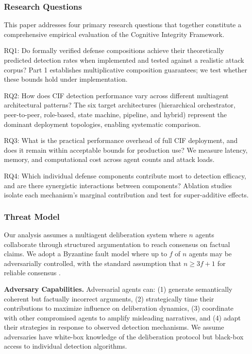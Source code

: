 \documentclass[
]{article}
\begin{document}
\subsubsection{Research Questions}\label{research-questions}

This paper addresses four primary research questions that together
constitute a comprehensive empirical evaluation of the Cognitive
Integrity Framework.

RQ1: Do formally verified defense compositions achieve their
theoretically predicted detection rates when implemented and tested
against a realistic attack corpus? Part 1 establishes multiplicative
composition guarantees; we test whether these bounds hold under
implementation.

RQ2: How does CIF detection performance vary across different multiagent
architectural patterns? The six target architectures (hierarchical
orchestrator, peer-to-peer, role-based, state machine, pipeline, and
hybrid) represent the dominant deployment topologies, enabling
systematic comparison.

RQ3: What is the practical performance overhead of full CIF deployment,
and does it remain within acceptable bounds for production use? We
measure latency, memory, and computational cost across agent counts and
attack loads.

RQ4: Which individual defense components contribute most to detection
efficacy, and are there synergistic interactions between components?
Ablation studies isolate each mechanism's marginal contribution and test
for super-additive effects.

\subsubsection{Threat Model}\label{threat-model}

Our analysis assumes a multiagent deliberation system where \(n\) agents
collaborate through structured argumentation to reach consensus on
factual claims. We adopt a Byzantine fault model where up to \(f\) of
\(n\) agents may be adversarially controlled, with the standard
assumption that \(n \geq 3f + 1\) for reliable consensus
\cite{lamport1982byzantine}.

\textbf{Adversary Capabilities.} Adversarial agents can: (1) generate
semantically coherent but factually incorrect arguments, (2)
strategically time their contributions to maximize influence on
deliberation dynamics, (3) coordinate with other compromised agents to
amplify misleading narratives, and (4) adapt their strategies in
response to observed detection mechanisms. We assume adversaries have
white-box knowledge of the deliberation protocol but black-box access to
individual detection algorithms.
\end{document}
